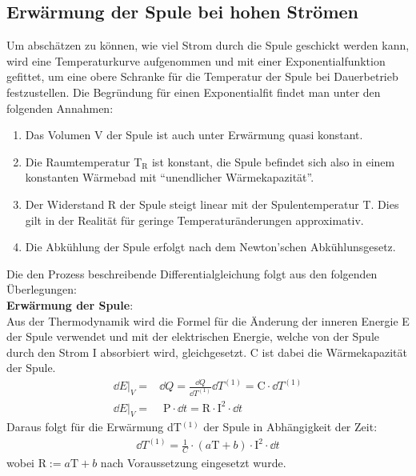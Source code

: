 \documentclass[12pt,a4paper]{article}
\begin{document}
\subsection{Erwärmung der Spule bei hohen Strömen}
\label{th:erwärmung}
Um abschätzen zu können, wie viel Strom durch die Spule geschickt werden kann, wird eine Temperaturkurve aufgenommen und mit einer Exponentialfunktion gefittet, um eine obere Schranke für die Temperatur der Spule bei Dauerbetrieb festzustellen. Die Begründung für einen Exponentialfit findet man unter den folgenden Annahmen:
\begin{enumerate}
	\item Das Volumen V der Spule ist auch unter Erwärmung quasi konstant.
	\item Die Raumtemperatur T$_\text{R}$ ist konstant, die Spule befindet sich also in einem konstanten Wärmebad mit "`unendlicher Wärmekapazität"'.
	\item Der Widerstand R der Spule steigt linear mit der Spulentemperatur T. Dies gilt in der Realität für geringe Temperaturänderungen approximativ.
	\item Die Abkühlung der Spule erfolgt nach dem Newton'schen Abkühlunsgesetz.
\end{enumerate}
Die den Prozess beschreibende Differentialgleichung folgt aus den folgenden Überlegungen:\\

\noindent\textbf{Erwärmung der Spule}:\\
Aus der Thermodynamik wird die Formel für die Änderung der inneren Energie E der Spule verwendet und mit der elektrischen Energie, welche von der Spule durch den Strom I absorbiert wird, gleichgesetzt. C ist dabei die Wärmekapazität der Spule.
\begin{align*}
\dd E|_V =& \dd{Q} = \frac{\dd Q}{\dd T^{(1)}}\dd T^{(1)} = \text{C}\cdot\dd T^{(1)}\\
\dd E|_V =& \text{ P}\cdot\dd{t} = \text{R}\cdot\text{I}^2\cdot \dd t
\end{align*}
Daraus folgt für die Erwärmung dT$^{(1)}$ der Spule in Abhängigkeit der Zeit:
\begin{align*}
\dd T^{(1)} = \frac{1}{C}\cdot(a\text{T}+b)\cdot\text{I}^2\cdot \dd t
\end{align*}
wobei $\text{R}:= a\text{T}+b$ nach Voraussetzung eingesetzt wurde.\\
\end{document}

